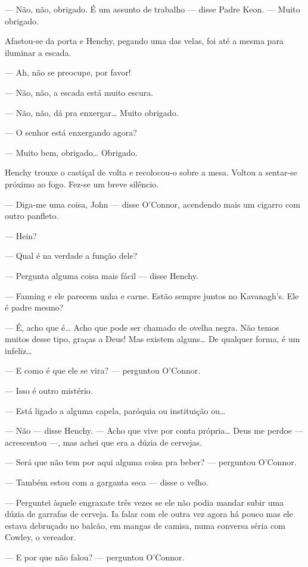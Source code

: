 --- Não, não, obrigado. É um assunto de trabalho --- disse Padre Keon.
--- Muito obrigado.

Afastou-se da porta e Henchy, pegando uma das velas, foi até a mesma
para iluminar a escada.

--- Ah, não se preocupe, por favor!

--- Não, não, a escada está muito escura.

--- Não, não, dá pra enxergar\ldots{} Muito obrigado.

--- O senhor está enxergando agora?

--- Muito bem, obrigado\ldots{} Obrigado.

Henchy trouxe o castiçal de volta e recolocou-o sobre a mesa. Voltou a
sentar-se próximo ao fogo. Fez-se um breve silêncio.

--- Diga-me uma coisa, John --- disse O'Connor, acendendo mais um
cigarro com outro panfleto.

--- Hein?

--- Qual é na verdade a função dele?

--- Pergunta alguma coisa mais fácil --- disse Henchy.

--- Fanning e ele parecem unha e carne. Estão sempre juntos no
Kavanagh's. Ele é padre mesmo?

--- É, acho que é\ldots{} Acho que pode ser chamado de ovelha negra. Não
temos muitos desse tipo, graças a Deus! Mas existem alguns\ldots{} De
qualquer forma, é um infeliz\ldots{}

--- E como é que ele se vira? --- perguntou O'Connor.

--- Isso é outro mistério.

--- Está ligado a alguma capela, paróquia ou instituição ou\ldots{}

--- Não --- disse Henchy. --- Acho que vive por conta própria\ldots{} Deus
me perdoe --- acrescentou ---, mas achei que era a dúzia de cervejas.

--- Será que não tem por aqui alguma coisa pra beber? --- perguntou
O'Connor.

--- Também estou com a garganta seca --- disse o velho.

--- Perguntei àquele engraxate três vezes se ele não podia mandar
subir uma dúzia de garrafas de cerveja. Ia falar com ele outra vez
agora há pouco mas ele estava debruçado no balcão, em mangas de
camisa, numa conversa séria com Cowley, o vereador.

--- E por que não falou? --- perguntou O'Connor.

